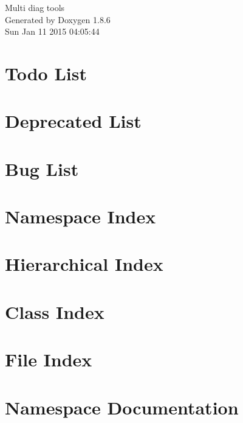 \documentclass[twoside]{book}
\newcommand{\clearemptydoublepage}{%
  \newpage{\pagestyle{empty}\cleardoublepage}%
}
\begin{document}
\hypersetup{pageanchor=false}
\begin{titlepage}
\vspace*{7cm}
\begin{center}%
{\Large Multi diag tools }\\
\vspace*{1cm}
{\large Generated by Doxygen 1.8.6}\\
\vspace*{0.5cm}
{\small Sun Jan 11 2015 04:05:44}\\
\end{center}
\end{titlepage}
\clearemptydoublepage
\tableofcontents
\clearemptydoublepage
{}
\hypersetup{pageanchor=true}

\chapter{Todo List}
\label{todo}
\hypertarget{todo}{}

\chapter{Deprecated List}
\label{deprecated}
\hypertarget{deprecated}{}

\chapter{Bug List}
\label{bug}
\hypertarget{bug}{}

\chapter{Namespace Index}

\chapter{Hierarchical Index}

\chapter{Class Index}

\chapter{File Index}

\chapter{Namespace Documentation}






\end{document}
